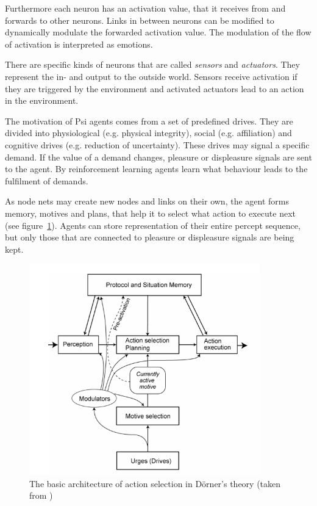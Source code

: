 Furthermore each neuron has an activation value, that it receives from and forwards to other neurons. Links in between neurons can be modified to dynamically modulate the forwarded activation value. The modulation of the flow of activation is interpreted as emotions.

There are specific kinds of neurons that are called \emph{sensors} and \emph{actuators}. They represent the in- and output to the outside world. Sensors receive activation if they are triggered by the environment and activated actuators lead to an action in the environment.

The motivation of Psi agents comes from a set of predefined drives. They are divided into physiological (e.g. physical integrity), social (e.g. affiliation) and cognitive drives (e.g. reduction of uncertainty). These drives may signal a specific demand. If the value of a demand changes, pleasure or displeasure signals are sent to the agent. By reinforcement learning agents learn what behaviour leads to the fulfilment of demands. 

As node nets may create new nodes and links on their own, the agent forms memory, motives and plans, that help it to select what action to execute next (see figure~\ref{motive_architecture}). Agents can store representation of their entire percept sequence, but only those that are connected to pleasure or displeasure signals are being kept.

\begin{figure}[h]
  \centering
    \includegraphics[width=10cm]{graphics/motive_architecture}
  \caption{The basic architecture of action selection in Dörner's theory (taken from \cite{Bach:2009:PSI:1611304})}
  \label{motive_architecture}
\end{figure}

